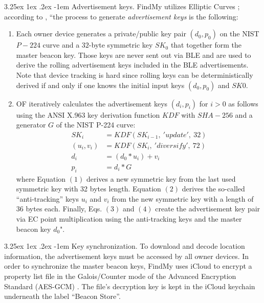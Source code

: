 \documentclass[english]{article}
\makeatletter
\renewcommand\paragraph{\@startsection{paragraph}{5}{\z@}%
  {3.25ex \@plus1ex \@minus.2ex}%
  {-1em}%
  {\normalfont\normalsize\bfseries}}
\makeatother
\begin{document}
\paragraph{Advertisement keys.}\label{keys}
FindMy utilizes Elliptic Curves \cite{ec}; according to \cite{aps,whocanfind}, ``the process to generate \textit{advertisement keys} is the following:
\begin{enumerate}
  \item Each owner device generates a private/public key pair
  $(d_0, p_0)$ on the NIST $P-224$ curve and a $32$-byte symmetric key $SK_0$ that together form the master beacon key. Those keys are never sent out via BLE and are used to derive the rolling advertisement keys included in the BLE advertisements. Note that device tracking is hard since rolling keys can be deterministically derived if and only if one knows the initial input keys $(d_0, p_0)$ and $SK0$.
  \item OF iteratively calculates the advertisement keys $(d_i,p_i)$ for $i > 0$ as follows using the ANSI X.963 key derivation
  function $KDF$ \cite{ANSI} with $SHA-256$ \cite{sha} and a generator $G$ of the NIST P-224 curve:
  \begin{align}
    SK_i &= KDF(SK_{i-1},\ 'update',\ 32) \\
    (u_i, v_i) &= KDF(SK_i,\ 'diversify',\ 72) \\
    d_i &= (d_0 * u_i) + v_i \\
    p_i &= d_i * G
  \end{align}
  where Equation $(1)$ derives a new symmetric key from the last used symmetric key with 32 bytes length. Equation $(2)$ derives the so-called “anti-tracking” keys $u_i$ and $v_i$ from the new symmetric key with a length of $36$ bytes each. Finally, Eqs. $(3)$ and $(4)$ create the advertisement key pair via EC point multiplication using the anti-tracking keys and the master beacon key $d_0$".
\end{enumerate}

\paragraph{Key synchronization.}
To download and decode location information, the advertisement keys must be accessed by all owner devices. In order to synchronize the master beacon keys, FindMy uses iCloud to encrypt a property list file in the Galois/Counter mode of the Advanced Encryption Standard (AES-GCM) \cite{gcm}. The file's decryption key is kept in the iCloud keychain underneath the label “Beacon Store”.
\end{document}
